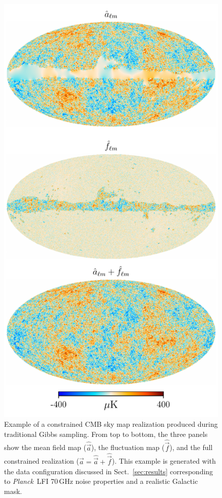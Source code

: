 \documentclass[twocolumn]{aa}
\def\Planck{\emph{Planck}}
\renewcommand{\a}[0]{\vec{a}}
\newcommand{\f}[0]{\vec{f}}
\begin{document}
\begin{figure}
	\centering
	\includegraphics[width=\linewidth]{figures/s_hat_f_hat.pdf}
	\caption{\label{fig:sky_map}Example of a constrained CMB sky map realization produced during traditional Gibbs sampling. From top to bottom, the three panels show the mean field map ($\hat{\a}$), the fluctuation map ($\hat{\f}$), and the full constrained realization ($\a = \hat{\a}+\hat{\f}$). This example is generated with the data configuration discussed in Sect.~\ref{sec:results} corresponding to \Planck\ LFI 70\,GHz noise properties and a realistic Galactic mask.}
\end{figure}
\end{document}
